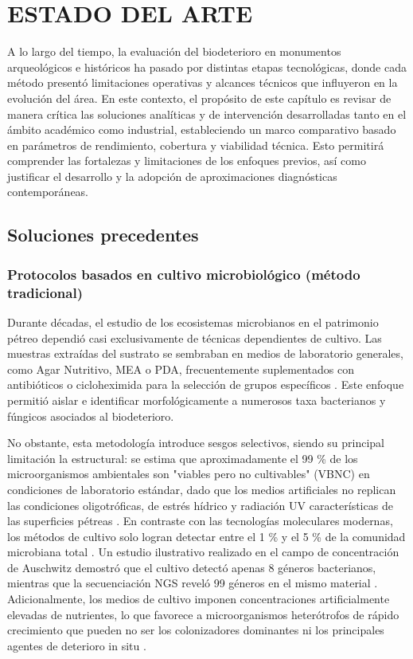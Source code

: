 \chapter{ESTADO DEL ARTE}
\label{chap:estado_arte}

A lo largo del tiempo, la evaluación del biodeterioro en monumentos arqueológicos e históricos ha pasado por distintas etapas tecnológicas, donde cada método presentó limitaciones operativas y alcances técnicos que influyeron en la evolución del área. En este contexto, el propósito de este capítulo es revisar de manera crítica las soluciones analíticas y de intervención desarrolladas tanto en el ámbito académico como industrial, estableciendo un marco comparativo basado en parámetros de rendimiento, cobertura y viabilidad técnica. Esto permitirá comprender las fortalezas y limitaciones de los enfoques previos, así como justificar el desarrollo y la adopción de aproximaciones diagnósticas contemporáneas. 

\section{Soluciones precedentes}
\label{sec:soluciones_precedentes}
\subsection{Protocolos basados en cultivo microbiológico (método tradicional)}
\label{subsec:cultivo_tradicional}
Durante décadas, el estudio de los ecosistemas microbianos en el patrimonio pétreo dependió casi exclusivamente de técnicas dependientes de cultivo. Las muestras extraídas del sustrato se sembraban en medios de laboratorio generales, como Agar Nutritivo, MEA o PDA, frecuentemente suplementados con antibióticos o cicloheximida para la selección de grupos específicos \cite{branysova2022}. Este enfoque permitió aislar e identificar morfológicamente a numerosos taxa bacterianos y fúngicos asociados al biodeterioro.

No obstante, esta metodología introduce sesgos selectivos, siendo su principal limitación la estructural: se estima que aproximadamente el 99 \% de los microorganismos ambientales son "viables pero no cultivables" (VBNC) en condiciones de laboratorio estándar, dado que los medios artificiales no replican las condiciones oligotróficas, de estrés hídrico y radiación UV características de las superficies pétreas \cite{branysova2022, sterflinger2013, suchy2024}. En contraste con las tecnologías moleculares modernas, los métodos de cultivo solo logran detectar entre el 1 \% y el 5 \% de la comunidad microbiana total \cite{li2018deterioration}. Un estudio ilustrativo realizado en el campo de concentración de Auschwitz demostró que el cultivo detectó apenas 8 géneros bacterianos, mientras que la secuenciación NGS reveló 99 géneros en el mismo material \cite{gutarowska2015}. Adicionalmente, los medios de cultivo imponen concentraciones artificialmente elevadas de nutrientes, lo que favorece a microorganismos heterótrofos de rápido crecimiento que pueden no ser los colonizadores dominantes ni los principales agentes de deterioro in situ \cite{branysova2022, zanardini2019}.

